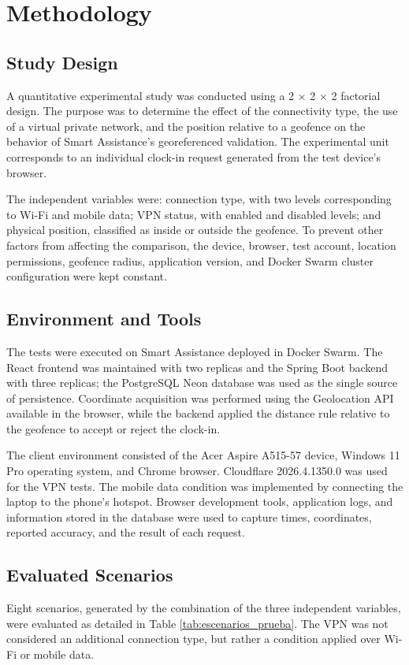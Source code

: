 \documentclass[runningheads]{llncs}
\begin{document}
\section{Methodology}
\subsection{Study Design}
A quantitative experimental study was conducted using a 2 × 2 × 2 factorial design. The purpose was to determine the effect of the connectivity type, the use of a virtual private network, and the position relative to a geofence on the behavior of Smart Assistance's georeferenced validation. The experimental unit corresponds to an individual clock-in request generated from the test device's browser.

The independent variables were: connection type, with two levels corresponding to Wi-Fi and mobile data; VPN status, with enabled and disabled levels; and physical position, classified as inside or outside the geofence. To prevent other factors from affecting the comparison, the device, browser, test account, location permissions, geofence radius, application version, and Docker Swarm cluster configuration were kept constant.

\subsection{Environment and Tools}
The tests were executed on Smart Assistance deployed in Docker Swarm. The React frontend was maintained with two replicas and the Spring Boot backend with three replicas; the PostgreSQL Neon database was used as the single source of persistence. Coordinate acquisition was performed using the Geolocation API available in the browser, while the backend applied the distance rule relative to the geofence to accept or reject the clock-in.

The client environment consisted of the Acer Aspire A515-57 device, Windows 11 Pro operating system, and Chrome browser. Cloudflare 2026.4.1350.0 was used for the VPN tests. The mobile data condition was implemented by connecting the laptop to the phone's hotspot. Browser development tools, application logs, and information stored in the database were used to capture times, coordinates, reported accuracy, and the result of each request.

\subsection{Evaluated Scenarios}
Eight scenarios, generated by the combination of the three independent variables, were evaluated as detailed in Table \ref{tab:escenarios_prueba}. The VPN was not considered an additional connection type, but rather a condition applied over Wi-Fi or mobile data.
\end{document}
